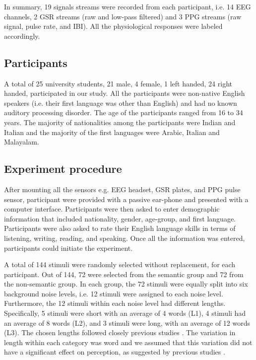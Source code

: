 \documentclass{article}
\begin{document}
In summary, 19 signals streams were recorded from each participant, i.e. 14 EEG channels, 2 GSR streams (raw and low-pass filtered) and 3 PPG streams (raw signal, pulse rate, and IBI). All the physiological responses were labeled accordingly.  

\subsection{Participants}
\label{ss:participants}
A total of 25 university students, 21 male, 4 female, 1 left handed, 24 right handed,  participated in our study. All the participants were non-native English speakers (i.e. their first language was other than English) and had no known auditory processing disorder. The age of the participants ranged from 16 to 34 years. The majority of nationalities among the participants were Indian and Italian and the majority of the first languages were Arabic, Italian and Malayalam. 

\subsection{Experiment procedure}
\label{ss:Procedure}
After mounting all the sensors e.g. EEG headset, GSR plates, and PPG pulse sensor, participant were provided with a passive ear-phone and presented with a computer interface. Participants were then asked to enter demographic information that included nationality, gender, age-group, and first language. Participants were also asked to rate their English language skills in terms of listening, writing, reading, and speaking. Once all the information was entered, participants could initiate the experiment. 

A total of 144 stimuli were randomly selected without replacement, for each participant. Out of 144, 72 were selected from the semantic group and 72 from the non-semantic group. In each group, the 72 stimuli were equally split into six background noise levels, i.e. 12 stimuli were assigned to each noise level. Furthermore, the 12 stimuli within each noise level had different lengths. Specifically, 5 stimuli were short with an average of 4 words (L1), 4 stimuli had an average of 8 words (L2), and 3 stimuli were long, with an average of 12 words (L3). The chosen lengths followed closely previous studies \cite{auralPerception1967}. 
The variation in length within each category was  word and we assumed that this variation did not have a significant effect on perception, as suggested by previous studies \cite{primacyModel1998, WordLengthEffects1995}. 
\end{document}
